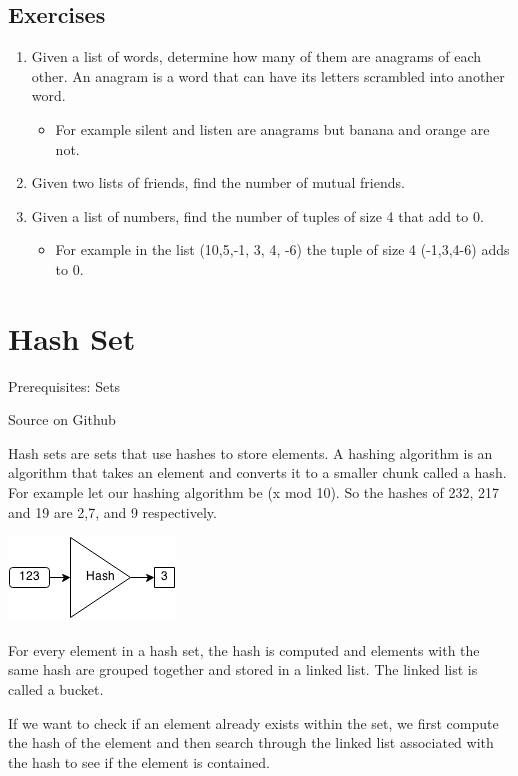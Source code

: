 \documentclass[11pt,oneside]{book}
\makeatletter
\def\maxwidth#1{\ifdim\Gin@nat@width>#1 #1\else\Gin@nat@width\fi}
\makeatother
\begin{document}
\subsection{Exercises}

\begin{enumerate}
\item Given a list of words, determine how many of them are anagrams of each other. An anagram is a word that can have its letters scrambled into another word. 

\begin{itemize}
\item For example silent and listen are anagrams but banana and orange are not.
\end{itemize}
\item Given two lists of friends, find the number of mutual friends.
\item Given a list of numbers, find the number of tuples of size 4 that add to 0. 

\begin{itemize}
\item For example in the list (10,5,-1, 3, 4, -6) the tuple of size 4 (-1,3,4-6) adds to 0.
\end{itemize}
\end{enumerate}
\section{Hash Set}

Prerequisites: Sets

Source on Github

Hash sets are sets that use hashes to store elements. A hashing algorithm is an algorithm that takes an element and converts it to a smaller chunk called a hash. For example let our hashing algorithm be (x mod 10). So the hashes of 232, 217 and 19 are 2,7, and 9 respectively.

\includegraphics[width=\maxwidth{\textwidth}]{hashcode.png}

For every element in a hash set, the hash is computed and elements with the same hash are grouped together and stored in a linked list. The linked list is called a bucket.

If we want to check if an element already exists within the set, we first compute the hash of the element and then search through the linked list associated with the hash to see if the element is contained.
\end{document}
